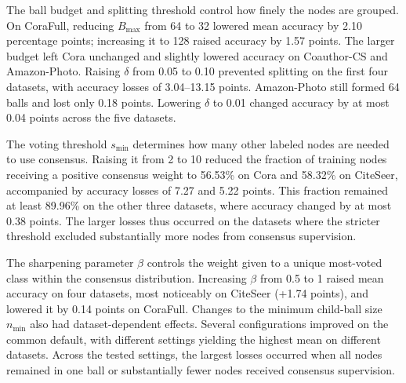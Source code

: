 The ball budget and splitting threshold control how finely the nodes are grouped. On CoraFull, reducing \(B_{\max}\) from 64 to 32 lowered mean accuracy by 2.10 percentage points; increasing it to 128 raised accuracy by 1.57 points. The larger budget left Cora unchanged and slightly lowered accuracy on Coauthor-CS and Amazon-Photo. Raising \(\delta\) from 0.05 to 0.10 prevented splitting on the first four datasets, with accuracy losses of 3.04--13.15 points. Amazon-Photo still formed 64 balls and lost only 0.18 points. Lowering \(\delta\) to 0.01 changed accuracy by at most 0.04 points across the five datasets.

The voting threshold \(s_{\min}\) determines how many other labeled nodes are needed to use consensus. Raising it from 2 to 10 reduced the fraction of training nodes receiving a positive consensus weight to 56.53\% on Cora and 58.32\% on CiteSeer, accompanied by accuracy losses of 7.27 and 5.22 points. This fraction remained at least 89.96\% on the other three datasets, where accuracy changed by at most 0.38 points. The larger losses thus occurred on the datasets where the stricter threshold excluded substantially more nodes from consensus supervision.

The sharpening parameter \(\beta\) controls the weight given to a unique most-voted class within the consensus distribution. Increasing \(\beta\) from 0.5 to 1 raised mean accuracy on four datasets, most noticeably on CiteSeer (+1.74 points), and lowered it by 0.14 points on CoraFull. Changes to the minimum child-ball size \(n_{\min}\) also had dataset-dependent effects. Several configurations improved on the common default, with different settings yielding the highest mean on different datasets. Across the tested settings, the largest losses occurred when all nodes remained in one ball or substantially fewer nodes received consensus supervision.

